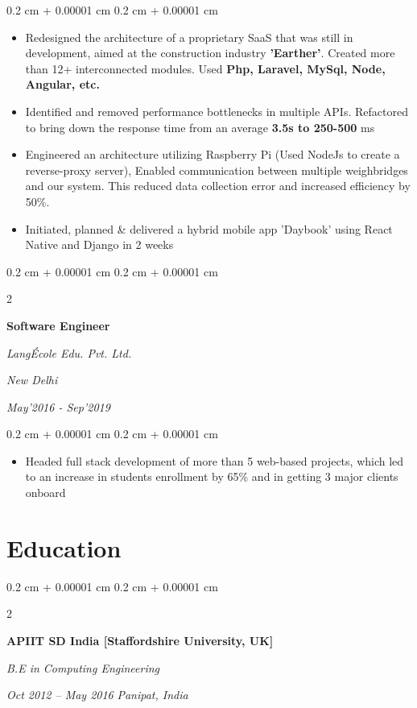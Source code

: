 \documentclass[10pt, letterpaper]{article}
\newenvironment{highlights}{
    \begin{itemize}[
        topsep=0.10 cm,
        parsep=0.10 cm,
        partopsep=0pt,
        itemsep=0pt,
        leftmargin=0.4 cm + 10pt
    ]
}{
    \end{itemize}
} %
\newenvironment{onecolentry}{
    \begin{adjustwidth}{
        0.2 cm + 0.00001 cm
    }{
        0.2 cm + 0.00001 cm
    }
}{
    \end{adjustwidth}
} %
\newenvironment{twocolentry}[2][]{
    \onecolentry
    \def\secondColumn{#2}
    \setcolumnwidth{\fill, 4.5 cm}
    \begin{paracol}{2}
}{
    \switchcolumn \raggedleft \secondColumn
    \end{paracol}
    \endonecolentry
} %
\begin{document}
        \vspace{0.10 cm}
        \begin{onecolentry}
            \begin{highlights}
                \item Redesigned the architecture of a proprietary SaaS that was still in development, aimed at the construction industry \textbf{'Earther'}. Created more than 12+ interconnected modules. Used \textbf{Php, Laravel, MySql, Node, Angular, etc.}
                \item Identified and removed performance bottlenecks in multiple APIs. Refactored to bring down the response time from an average \textbf{3.5s to 250-500} ms
                \item Engineered an architecture utilizing Raspberry Pi (Used NodeJs to create a reverse-proxy server), Enabled communication between multiple weighbridges and our system. This reduced data collection error and increased efficiency by 50\%.
                \item Initiated, planned \& delivered a hybrid mobile app 'Daybook' using React Native and Django in 2 weeks \end{highlights} \end{onecolentry}
        \vspace{0.2 cm}
        \begin{twocolentry}{
        \textit{New Delhi}    
            
        \textit{May’2016 - Sep’2019}}
            \textbf{Software Engineer}
            
            \textit{LangÉcole Edu. Pvt. Ltd.}
        \end{twocolentry}

        \vspace{0.10 cm}
        \begin{onecolentry}
            \begin{highlights}
                \item Headed full stack development of more than 5 web-based projects, which led to an increase in students enrollment by 65\% and in getting 3 major clients onboard
            \end{highlights}
        \end{onecolentry}
    \section{Education}
        \begin{twocolentry}{
            
            
        \textit{Oct 2012 – May 2016}
        \textit{Panipat, India}}
            \textbf{APIIT SD India [Staffordshire University, UK]}

            \textit{B.E in Computing Engineering}
        \end{twocolentry}
\end{document}
